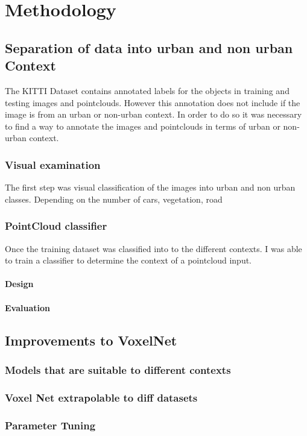 \let\textcircled=\pgftextcircled
\chapter{Methodology}
\label{chap:body}




\section{Separation of data into urban and non urban Context}

The KITTI Dataset contains annotated labels for the objects in training and testing images and pointclouds. However this annotation does not include if the image is from an urban or non-urban context. 
In order to do so it was necessary to find a way to annotate the images and pointclouds in terms of urban or non-urban context. 

\subsection{Visual examination}
 The first step was visual classification of the images into urban and non urban classes. 
 Depending on the  number of cars, vegetation, road 

\subsection{PointCloud classifier}
Once the training dataset was classified into to the different contexts. I was able to train a classifier to determine the context of a pointcloud input. 

\subsubsection{Design}

\subsubsection{Evaluation}
	
	

\section{Improvements to VoxelNet}
\subsection{Models that are suitable to different contexts}

\subsection{Voxel Net extrapolable to diff datasets}	

\subsection{Parameter Tuning}